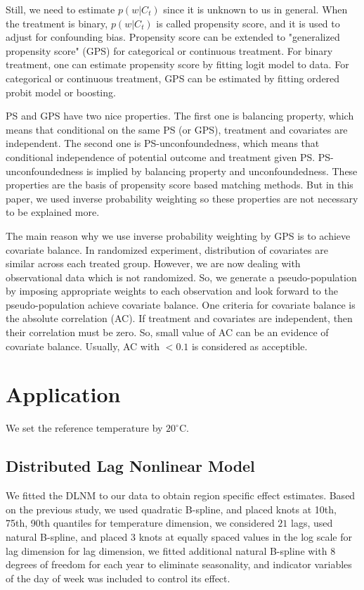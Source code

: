 \documentclass[12pt]{article}
\begin{document}
Still, we need to estimate $p(w\lvert C_t)$ since it is unknown to us in general.
When the treatment is binary, $p(w\lvert C_t)$ is called propensity score,
and it is used to adjust for confounding bias\cite{rosenbaum1983}.
Propensity score can be extended to 
"generalized propensity score" (GPS) for categorical or continuous treatment\cite{imbens2000}.
For binary treatment, one can estimate propensity score by fitting logit model to data.
For categorical or continuous treatment, GPS can be estimated by fitting ordered probit model or boosting.

PS and GPS have two nice properties\cite{rosenbaum1983, hirano2004}.
The first one is balancing property, which means that conditional on the same PS (or GPS),
treatment and covariates are independent.
The second one is PS-unconfoundedness, 
which means that conditional independence of potential outcome and treatment given PS.
PS-unconfoundedness is implied by balancing property and unconfoundedness.
These properties are the basis of propensity score based matching methods.
But in this paper, 
we used inverse probability weighting so these properties are not necessary to be explained more.

The main reason why we use inverse probability weighting by GPS is to achieve covariate balance.
In randomized experiment, distribution of covariates are similar across each treated group.
However, we are now dealing with observational data which is not randomized.
So, we generate a pseudo-population by imposing appropriate weights to each observation
and look forward to the pseudo-population achieve covariate balance.
One criteria for covariate balance is the absolute correlation (AC)\cite{gpsboosting2015}.
If treatment and covariates are independent, then their correlation must be zero.
So, small value of AC can be an evidence of covariate balance.
Usually, AC with $ <0.1 $ is considered as acceptible.


\section{Application}
\label{section:application}

We set the reference temperature by $20^\circ$C.
\subsection{Distributed Lag Nonlinear Model}

We fitted the DLNM to our data to obtain region specific effect estimates.
Based on the previous study\cite{gasparrini2015},
we used quadratic B-spline, and placed knots at 10th, 75th, 90th quantiles
for temperature dimension,
we considered $21$ lags, used natural B-spline, 
and placed $3$ knots at equally spaced values in the log scale for lag dimension
for lag dimension,
we fitted additional natural B-spline with $8$ degrees of freedom for each year
to eliminate seasonality,
and indicator variables of the day of week was included to control its effect.
\end{document}
